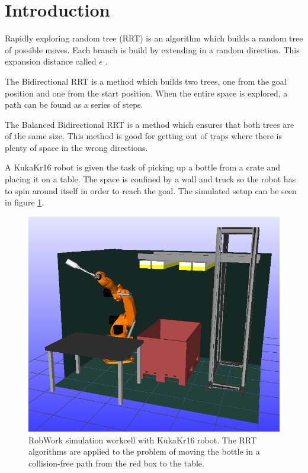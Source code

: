 \section{Introduction} 
Rapidly exploring random tree (RRT) is an algorithm which builds a random tree of possible moves. 
Each branch is build by extending in a random direction.
This expansion distance called \(\epsilon\) \citep{pathplanning}.

The Bidirectional RRT is a method which builds two trees, one from the goal position and one from the start position. 
When the entire space is explored, a path can be found as a series of steps.

The Balanced Bidirectional RRT is a method which ensures that both trees are of the same size. 
This method is good for getting out of traps where there is plenty of space in the wrong directions.

A KukaKr16 robot is given the task of picking up a bottle from a crate and placing it on a table.
The space is confined by a wall and truck so the robot has to spin around itself in order to reach the goal.
The simulated setup can be seen in figure \ref{fig:worckcell_bottle_picked}.

\begin{figure}[h]
 \centering
 \includegraphics[width=\figsize]{graphics/robworkpic}
 \caption{RobWork simulation workcell with KukaKr16 robot.
 The RRT algorithms are applied to the problem of moving the bottle
 in a collision-free path from the red box to the table.}
 \label{fig:worckcell_bottle_picked}
\end{figure}

